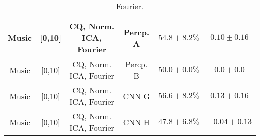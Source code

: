 \begin{table}[!htb]
{\begin{tabular}{c|c|c|c|c|c}
    \hline
    Music               & [0,10]                                        & CQ, Norm. ICA, Fourier    & Percp. A              &  $54.8 \pm 8.2\%$     & $0.10 \pm 0.16$\\
    \hline
    Music               & [0,10]                                        & CQ, Norm. ICA, Fourier    & Percp. B              &  $50.0 \pm 0.0\%$     & $0.0 \pm 0.0$\\
    \hline
    Music               & [0,10]                                        & CQ, Norm. ICA, Fourier    & CNN G                 &  $56.6 \pm 8.2\%$     & $0.13 \pm 0.16$\\
    \hline
    Music               & [0,10]                                        & CQ, Norm. ICA, Fourier    & CNN H                 &  $47.8 \pm 6.8\%$     & $-0.04 \pm 0.13$\\
    \hline
\end{tabular}
}
\caption{Fourier.}
\label{tab:sound-fourier-app}
\end{table}
